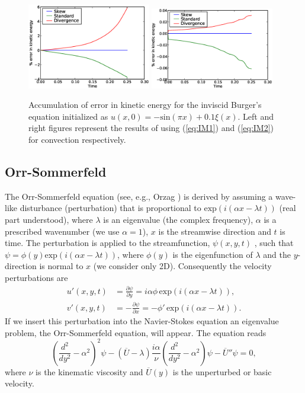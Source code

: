 \begin{figure}
 \includegraphics[width=0.48\textwidth]{chapters/mortensen/eps/Burgers_KE_IM1.eps}
 \includegraphics[width=0.48\textwidth]{chapters/mortensen/eps/Burgers_KE_IM2.eps}
 \caption{
Accumulation of error in kinetic energy for the inviscid Burger's equation initialized as $u(x,0)=-\text{sin}(\pi x)+0.1 \xi(x)$. Left and right figures represent the results of using (\ref{eq:IM1}) and (\ref{eq:IM2}) for convection respectively.
}
\label{fig:burgers_KE}
\end{figure}

\subsection{Orr-Sommerfeld}
\label{sec:OS}
The Orr-Sommerfeld equation (see, e.g., Orzag \cite{orzag71}) is derived by assuming a wave-like disturbance (perturbation) that is proportional to $\text{exp}(i(\alpha x-\lambda t))$ (real part understood), where $\lambda$ is an eigenvalue (the complex frequency), $\alpha$ is a prescribed wavenumber (we use $\alpha=1$), $x$ is the streamwise direction and $t$ is time. The perturbation is applied to the streamfunction, $\psi(x,y,t)$ , such that $\psi=\phi(y) \text{exp}(i(\alpha x- \lambda t))$, where $\phi(y)$ is the eigenfunction of $\lambda$ and the $y$-direction is normal to $x$ (we consider only 2D). Consequently the velocity perturbations are
\begin{align}
 u'(x,y,t)&=\frac{\partial \psi}{\partial y}=i\alpha \phi \, \text{exp}(i(\alpha x- \lambda t)),\\
 v'(x,y,t)&=-\frac{\partial \psi}{\partial x}=-\phi' \, \text{exp}(i(\alpha x- \lambda t)).
\end{align}
If we insert this perturbation into the Navier-Stokes equation an eigenvalue problem, the Orr-Sommerfeld equation, will appear. The equation reads
\begin{equation}
 \left( \frac{d^2}{dy^2}-\alpha^2\right)^2\psi - \left(\overline{U}-\lambda \right) \frac{i \alpha}{\nu} \left( \frac{d^2}{dy^2}-\alpha^2\right)\psi - \overline{U}''\psi=0,
 \label{eq:OrrS}
\end{equation}
where $\nu$ is the kinematic viscosity and $\overline{U}(y)$ is the unperturbed or basic velocity.

